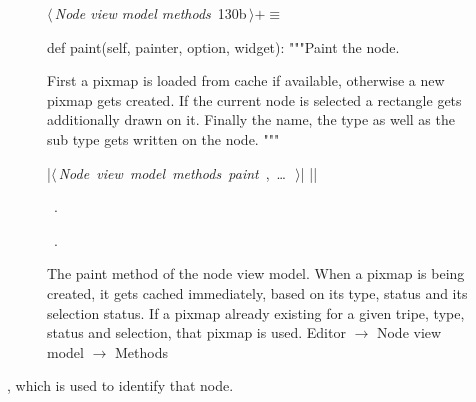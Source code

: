 \documentclass[%
    a4paper,    %
    justified,  %
    nobib,      %
    openany     %
]{tufte-book}
\makeatletter
\renewcommand{\label}[1]{\@tufte@label{##1}}%
\makeatother
\begin{document}
\begin{figure}[!htbp]
\begin{flushleft} \small
\begin{minipage}{\linewidth}\label{scrap72}\raggedright\small
{} $\langle\,${\itshape Node view model methods}\nobreak\ {\footnotesize {130b}}$\,\rangle+\equiv$
\vspace{-1ex}
\begin{pythoncode}
def paint(self, painter, option, widget):
    """Paint the node.

    First a pixmap is loaded from cache if available, otherwise
    a new pixmap gets created. If the current node is selected a
    rectangle gets additionally drawn on it. Finally the name,
    the type as well as the sub type gets written on the node.
    """

    |\hbox{$\langle\,${\itshape Node view model methods paint}\nobreak\ {\footnotesize {}, \ldots\ }$\,\rangle$}|
|\NWsep|
\end{pythoncode}
\vspace{1.5ex}
\footnotesize
\begin{list}{}{\setlength{\itemsep}{-\parsep}\setlength{\itemindent}{-\leftmargin}}
\item \NWtxtMacroDefBy\ .
\item \NWtxtMacroRefIn\ .

\item{}
\end{list}
\end{minipage}\vspace{4ex}
\end{flushleft}
\caption{The paint method of the node view model. When a pixmap is being
  created, it gets cached immediately, based on its type, status and its
  selection status. If a pixmap already existing for a given tripe, type, status
  and selection, that pixmap is used.
  \newline{}\newline{}Editor $\rightarrow$ Node view model $\rightarrow$
  Methods}
\end{figure}

, which is used to identify that
node.
\end{document}

